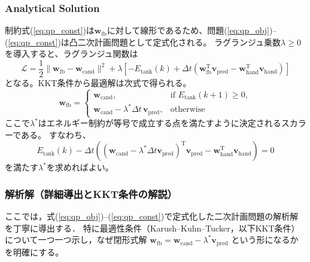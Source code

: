 \documentclass[uplatex]{jsarticle}
\begin{document}
\subsubsection{Analytical Solution}
制約式(\ref{eq:qp_const})は$\boldsymbol{w}_{\mathrm{fb}}$に対して線形であるため、問題(\ref{eq:qp_obj})--(\ref{eq:qp_const})は凸二次計画問題として定式化される。
ラグランジュ乗数$\lambda \ge 0$を導入すると、ラグランジュ関数は
\begin{equation}
\mathcal{L} = \frac{1}{2}\|\boldsymbol{w}_{\mathrm{fb}} - \boldsymbol{w}_{\mathrm{cand}}\|^2 
+ \lambda \left[ -E_{\mathrm{tank}}(k) + \Delta t \left( \boldsymbol{w}_{\mathrm{fb}}^{\mathrm{T}} \boldsymbol{v}_{\mathrm{pred}} - \boldsymbol{w}_{\mathrm{hand}}^{\mathrm{T}} \boldsymbol{v}_{\mathrm{hand}} \right) \right]
\end{equation}
となる。KKT条件から最適解は次式で得られる。
\begin{equation}
\boldsymbol{w}_{\mathrm{fb}} =
\begin{cases}
\boldsymbol{w}_{\mathrm{cand}}, & \text{if } E_{\mathrm{tank}}(k+1) \ge 0, \\
\boldsymbol{w}_{\mathrm{cand}} - \lambda^\ast \Delta t \, \boldsymbol{v}_{\mathrm{pred}}, & \text{otherwise}
\end{cases}
\end{equation}
ここで$\lambda^\ast$はエネルギー制約が等号で成立する点を満たすように決定されるスカラーである。  
すなわち、
\begin{equation}
E_{\mathrm{tank}}(k) - \Delta t \left( (\boldsymbol{w}_{\mathrm{cand}} - \lambda^\ast \Delta t \boldsymbol{v}_{\mathrm{pred}})^{\mathrm{T}} \boldsymbol{v}_{\mathrm{pred}} - \boldsymbol{w}_{\mathrm{hand}}^{\mathrm{T}} \boldsymbol{v}_{\mathrm{hand}} \right) = 0
\end{equation}
を満たす$\lambda^\ast$を求めればよい。

\subsubsection{解析解（詳細導出とKKT条件の解説）}
ここでは，式(\ref{eq:qp_obj})--(\ref{eq:qp_const})で定式化した二次計画問題の解析解を丁寧に導出する．
特に最適性条件（Karush--Kuhn--Tucker，以下KKT条件）について一つ一つ示し，なぜ閉形式解
\(\boldsymbol{w}_{\mathrm{fb}} = \boldsymbol{w}_{\mathrm{cand}} - \lambda^\ast \boldsymbol{v}_{\mathrm{pred}}\)
という形になるかを明確にする。
\end{document}
